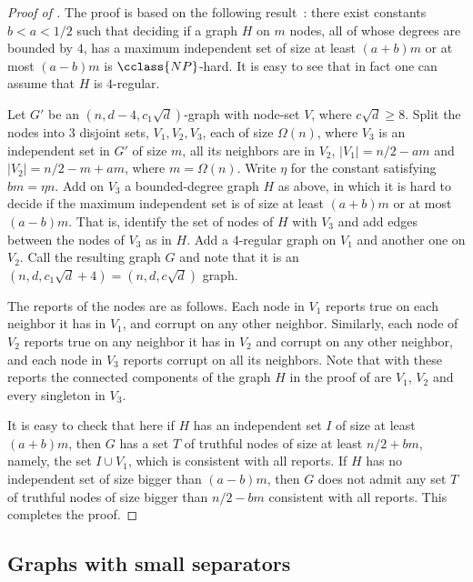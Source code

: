 \documentclass{toc}
\begin{document}
\noindent
%
\begin{proof}[Proof of ]
The proof is based on the following result~\cite{BK99}: there exist
constants $b<a<1/2$ such that deciding if a graph $H$ on $m$ nodes,
all of whose degrees are bounded by $4$, has a maximum independent set
of size at least $(a+b) m$ or at most $(a-b) m$ is $\cclass{NP}$-hard.
It is easy to see that in fact one can assume that 
$H$ is $4$-regular. 
 
Let $G'$ be an $(n,d-4,c_1\sqrt{d})$-graph with node-set $V$, where
$c \sqrt{d} \geq 8$.  
Split the nodes into $3$ disjoint sets, $V_1,V_2,V_3$, each
of size $\Omega(n)$, 
where $V_3$ is an independent set in $G'$ of size $m$, all its neighbors
are in $V_2$, $|V_1|=n/2-am$ and $|V_2|=n/2-m+am$, 
where $m = \Omega(n)$. Write $\eta$ for the constant satisfying $b m=\eta n$. 
%
%
Add on $V_3$ a bounded-degree graph $H$ as above, in which it is hard to
decide if the maximum independent set is of size at least $(a+b)m$ or at
most $(a-b)m$. That is, identify the set of nodes of $H$ with $V_3$
and add edges between the nodes of $V_3$ as in $H$. 
Add a $4$-regular graph on $V_1$ and another one on $V_2$. 
Call the resulting
graph $G$ and note that it is an $(n,d,c_1\sqrt{d} + 4)=
(n,d,c\sqrt d)$ graph. 

The reports of the nodes are as follows.  Each node in $V_1$
reports true on each neighbor it has in $V_1$, and corrupt on  any other
neighbor. Similarly, each node of $V_2$ reports true on any neighbor
it has in $V_2$ and corrupt on any other neighbor, and each node in $V_3$
reports corrupt on all its neighbors.  Note that with these reports the
connected components of the graph $H$ in the proof of 
are $V_1$, $V_2$ and every singleton in $V_3$.

It is easy to check that here if $H$ has an independent set $I$ of size
at least $(a+b)m$, then $G$ has a set $T$ of truthful  nodes of size
at least $n/2+bm$, namely, the set $I \cup V_1$, which is consistent with
all reports. If $H$ has no independent set of size bigger than $(a-b)m$,
then $G$ does not admit any set $T$ of truthful nodes of size bigger
than $n/2 - bm$ consistent with all reports. This completes the proof.
%
%
\end{proof}

\subsection{Graphs with small separators} \label{subsec:bad_expanders}
\end{document}
